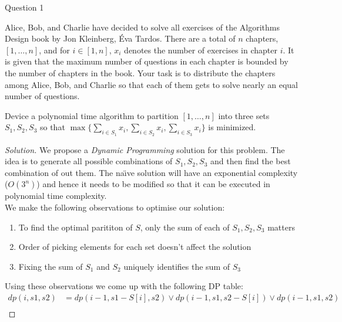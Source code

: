 \begin{solution}{Question 1}\label{ques:1}
    \begin{question}
        Alice, Bob, and Charlie have decided to solve all exercises of the Algorithms Design book by Jon Kleinberg, Éva Tardos. There are a total of $n$ chapters, $[1, \ldots, n]$, and for $i\in [1, n]$, $x_i$ denotes the number of exercises in chapter $i$. It is given that the maximum number of questions in each chapter is bounded by the number of chapters in the book. Your task is to distribute the chapters among Alice, Bob, and Charlie so that each of them gets to solve nearly an equal number
        of questions.\par
        Device a polynomial time algorithm to partition $[1, \ldots, n]$ into three sets $S_1, S_2, S_3$ so that $\max\{\sum_{i\in S_1}{x_i}, \sum_{i\in S_2}{x_i}, \sum_{i\in S_3}{x_i}\}$ is minimized.
    \end{question}
    \tcblower{}
    \begin{proof}[Solution]
        We propose a \textit{Dynamic Programming} solution for this problem. The idea is to generate all possible combinations of $S_1, S_2, S_3$ and then find the best combination of out them. The na\"{\i}ve solution will have an exponential complexity ($O(3^n)$) and hence it needs to be modified so that it can be executed in polynomial time complexity.\\
        We make the following observations to optimise our solution:
        \begin{enumerate}
            \item To find the optimal parititon of $S$, only the sum of each of $S_1, S_2, S_3$ matters
            \item Order of picking elements for each set doesn't affect the solution
            \item Fixing the sum of $S_1$ and $S_2$ uniquely identifies the sum of $S_3$
        \end{enumerate}
        Using these observations we come up with the following DP table:
        \begin{equation}\label{eq:dp_q1}
            \begin{split}
                dp(i, s1, s2) &= dp(i-1, s1-S[i], s2)\vee dp(i-1, s1, s2-S[i])\vee dp(i-1, s1, s2)\\

\end{split}
\end{equation}
\end{proof}
\end{solution}
